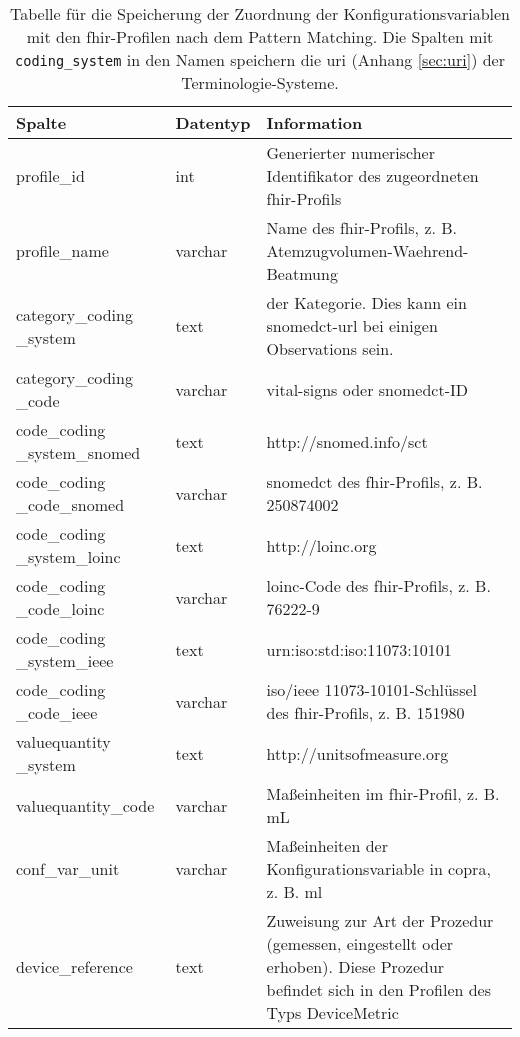 \begin{longtable}{|p{3.5cm}|l|p{6.5cm}|}
	\caption[Tabelle für die Speicherung der Zuordnung der Konfigurationsvariablen mit den \acs{fhir}-Profilen]{Tabelle für die Speicherung der Zuordnung der Konfigurationsvariablen mit den \acs{fhir}-Profilen nach dem Pattern Matching. Die Spalten mit \texttt{coding\_system} in den Namen speichern die \ac{uri} (Anhang \ref{sec:uri}) der Terminologie-Systeme.}
	\label{tab:mapping}
	\endfirsthead
	\hline			
		\bfseries Spalte & \bfseries Datentyp & \bfseries Information \\ \hline		
		profile\_id & int & Generierter numerischer Identifikator des zugeordneten \ac{fhir}-Profils \\ \hline
		profile\_name & varchar & Name des \ac{fhir}-Profils, z. B. Atemzugvolumen-Waehrend-Beatmung \\ \hline
		category\_coding \_system & text & \acsu{url} der Kategorie. Dies kann ein \ac{snomedct}-\ac{url} bei einigen \glqq Observations\grqq{} sein. \\ \hline
		category\_coding \_code & varchar & \glqq vital-signs\grqq{} oder \ac{snomedct}-ID \\ \hline
		code\_coding \_system\_snomed & text & http://snomed.info/sct \\ \hline 
		code\_coding \_code\_snomed & varchar & \ac{snomedct} des \ac{fhir}-Profils, z. B. 250874002 \\ \hline
		code\_coding \_system\_loinc & text & http://loinc.org \\ \hline
		code\_coding \_code\_loinc & varchar & \ac{loinc}-Code des \ac{fhir}-Profils, z. B. 76222-9 \\ \hline
		code\_coding \_system\_ieee & text & urn:iso:std:iso:11073:10101 \\ \hline
		code\_coding \_code\_ieee & varchar & \ac{iso}/\ac{ieee} 11073-10101\texttrademark{}-Schlüssel des \ac{fhir}-Profils, z. B. 151980 \\ \hline
		valuequantity \_system & text & http://unitsofmeasure.org \\ \hline
		valuequantity\_code & varchar & Maßeinheiten im \ac{fhir}-Profil, z. B. mL \\ \hline
		conf\_var\_unit & varchar & Maßeinheiten der Konfigurationsvariable in \ac{copra}, z. B. ml \\ \hline
		device\_reference & text & Zuweisung zur Art der Prozedur (gemessen, eingestellt oder erhoben). Diese Prozedur befindet sich in den Profilen des Typs \glqq DeviceMetric\grqq{} \\ \hline

\end{longtable}
